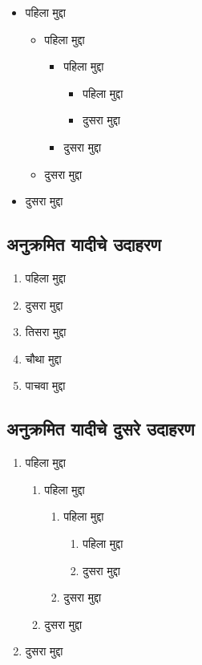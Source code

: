 \begin{itemize}
\item पहिला मुद्दा
  \begin{itemize}
  \item पहिला मुद्दा
    \begin{itemize}
    \item पहिला मुद्दा
      \begin{itemize}
      \item पहिला मुद्दा
      \item दुसरा मुद्दा
      \end{itemize}
    \item दुसरा मुद्दा
    \end{itemize}
  \item दुसरा मुद्दा
  \end{itemize}
\item दुसरा मुद्दा
\end{itemize}

\subsection{अनुक्रमित यादीचे उदाहरण}

\begin{enumerate}
\item पहिला मुद्दा
\item दुसरा मुद्दा
\item तिसरा मुद्दा
\item चौथा मुद्दा
\item पाचवा मुद्दा
\end{enumerate}

\subsection*{अनुक्रमित यादीचे दुसरे उदाहरण}

\begin{enumerate}
\item पहिला मुद्दा
  \begin{enumerate}
  \item पहिला मुद्दा
    \begin{enumerate}
    \item पहिला मुद्दा
      \begin{enumerate}
      \item पहिला मुद्दा
      \item दुसरा मुद्दा
      \end{enumerate}
    \item दुसरा मुद्दा
    \end{enumerate}
  \item दुसरा मुद्दा
  \end{enumerate}
\item दुसरा मुद्दा
\end{enumerate}

